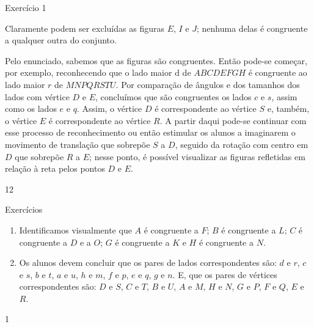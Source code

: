 \clearpage
\begin{sugestions}{Exercício 1}
{
Claramente podem ser excluídas as figuras $E$, $I$ e $J$; nenhuma delas é congruente a qualquer outra do conjunto. 

Pelo enunciado, sabemos que as figuras são congruentes. Então pode-se começar, por exemplo, reconhecendo que o lado maior d de $ABCDEFGH$ é congruente ao lado maior $r$ de $MNPQRSTU$. Por comparação de ângulos e dos tamanhos dos lados com vértice $D$ e $E$, concluímos que são congruentes os lados $c$ e $s$, assim como os lados $e$ e $q$. Assim, o vértice $D$ é correspondente ao vértice $S$ e, também, o vértice $E$ é correspondente ao vértice $R$. A partir daqui pode-se continuar com esse processo de reconhecimento ou então estimular os alunos a imaginarem o movimento de translação que sobrepõe $S$ a $D$, seguido da rotação com centro em $D$ que sobrepõe $R$ a $E$; nesse ponto, é possível visualizar as figuras refletidas em relação à reta pelos pontos $D$ e $E$.  
}{1}{2}
\end{sugestions}
\begin{answer}{Exercícios}
{\exerciselist
\begin{enumerate}
\item Identificamos visualmente que $A$ é congruente a $F$; $B$ é congruente a $L$; $C$ é congruente a $D$ e a $O$; $G$ é congruente a $K$ e $H$ é congruente a $N$.

\item Os alunos devem concluir que os pares de lados correspondentes são: $d$ e $r$, $c$ e $s$, $b$ e $t$, $a$ e $u$, $h$ e $m$, $f$ e $p$, $e$ e $q$, $g$ e $n$.  E, que os pares de vértices correspondentes são: $D$ e $S$, $C$ e $T$, $B$ e $U$, $A$ e $M$, $H$ e $N$, $G$ e $P$, $F$ e $Q$, $E$ e $R$.
\end{enumerate}
}{1}
\end{answer}
\clearmargin

